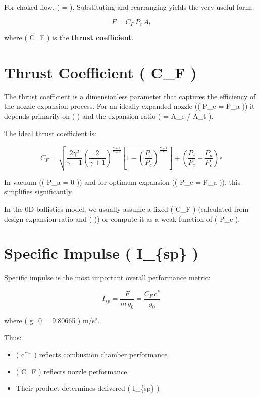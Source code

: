 \documentclass[
  letterpaper,
  DIV=11,
  numbers=noendperiod]{scrreprt}
\providecommand{\tightlist}{%
  \setlength{\itemsep}{0pt}\setlength{\parskip}{0pt}}
\begin{document}
For choked flow, (  =  ). Substituting and
rearranging yields the very useful form:

\[
F = C_F \, P_c \, A_t
\]

where ( C\_F ) is the \textbf{thrust coefficient}.

\section{Thrust Coefficient ( C\_F )}\label{thrust-coefficient-c_f}

The thrust coefficient is a dimensionless parameter that captures the
efficiency of the nozzle expansion process. For an ideally expanded
nozzle (( P\_e = P\_a )) it depends primarily on ( \gamma ) and the
expansion ratio ( \epsilon = A\_e / A\_t ).

The ideal thrust coefficient is:

\[
C_F = \sqrt{ \frac{2 \gamma^2}{\gamma - 1} \left( \frac{2}{\gamma + 1} \right)^{\frac{\gamma + 1}{\gamma - 1}} \left[ 1 - \left( \frac{P_e}{P_c} \right)^{\frac{\gamma - 1}{\gamma}} \right] } + \left( \frac{P_e}{P_c} - \frac{P_a}{P_c} \right) \epsilon
\]

In vacuum (( P\_a = 0 )) and for optimum expansion (( P\_e = P\_a )),
this simplifies significantly.

In the 0D ballistics model, we usually assume a fixed ( C\_F )
(calculated from design expansion ratio and ( \gamma )) or compute it as
a weak function of ( P\_c ).

\section{Specific Impulse ( I\_\{sp\} )}\label{specific-impulse-i_sp}

Specific impulse is the most important overall performance metric:

\[
I_{sp} = \frac{F}{\dot{m} \, g_0} = \frac{C_F \, c^*}{g_0}
\]

where ( g\_0 = 9.80665 ) m/s².

Thus:

\begin{itemize}
\tightlist
\item
  ( c\^{}* ) reflects combustion chamber performance
\item
  ( C\_F ) reflects nozzle performance
\item
  Their product determines delivered ( I\_\{sp\} )
\end{itemize}
\end{document}
